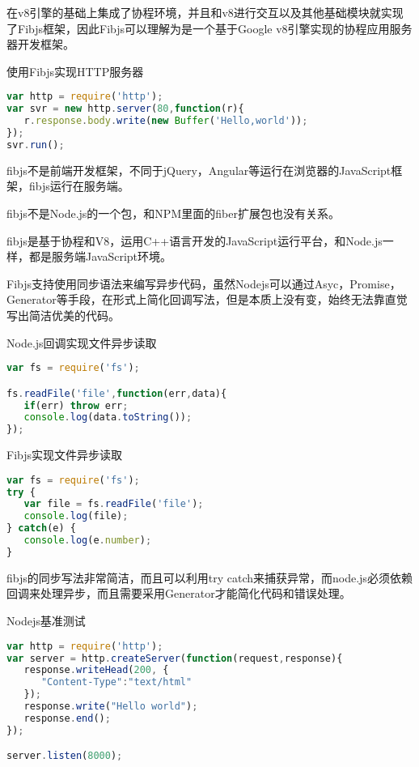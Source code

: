 在v8引擎的基础上集成了协程环境，并且和v8进行交互以及其他基础模块就实现了Fibjs框架，因此Fibjs可以理解为是一个基于Google v8引擎实现的协程应用服务器开发框架。


\begin{example}
使用Fibjs实现HTTP服务器
\begin{lstlisting}[language=JavaScript]
var http = require('http');
var svr = new http.server(80,function(r){
   r.response.body.write(new Buffer('Hello,world'));
});
svr.run();
\end{lstlisting}
\end{example}

\begin{compactitem}
\item fibjs不是前端开发框架，不同于jQuery，Angular等运行在浏览器的JavaScript框架，fibjs运行在服务端。
\item fibjs不是Node.js的一个包，和NPM里面的fiber扩展包也没有关系。
\item fibjs是基于协程和V8，运用C++语言开发的JavaScript运行平台，和Node.js一样，都是服务端JavaScript环境。
\end{compactitem}

Fibjs支持使用同步语法来编写异步代码，虽然Nodejs可以通过Asyc，Promise，Generator等手段，在形式上简化回调写法，但是本质上没有变，始终无法靠直觉写出简洁优美的代码。



\begin{example}
Node.js回调实现文件异步读取
\begin{lstlisting}[language=JavaScript]
var fs = require('fs');

fs.readFile('file',function(err,data){
   if(err) throw err;
   console.log(data.toString());
});
\end{lstlisting}
\end{example}


\begin{example}
Fibjs实现文件异步读取
\begin{lstlisting}[language=JavaScript]
var fs = require('fs');
try {
   var file = fs.readFile('file');
   console.log(file);
} catch(e) {
   console.log(e.number);
}
\end{lstlisting}
\end{example}

fibjs的同步写法非常简洁，而且可以利用try catch来捕获异常，而node.js必须依赖回调来处理异步，而且需要采用Generator才能简化代码和错误处理。


\begin{example}
Nodejs基准测试
\begin{lstlisting}[language=JavaScript]
var http = require('http');
var server = http.createServer(function(request,response){
   response.writeHead(200, {
      "Content-Type":"text/html"
   });
   response.write("Hello world");
   response.end();
});

server.listen(8000);
\end{lstlisting}
\end{example}



